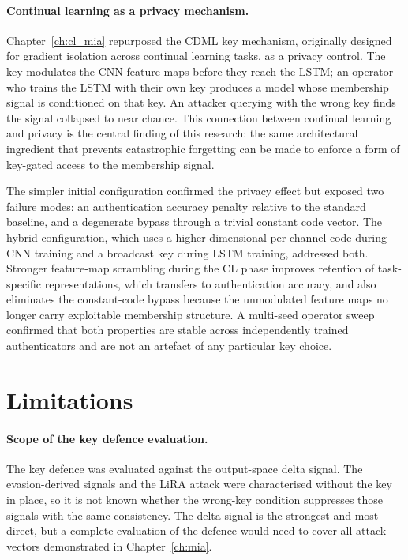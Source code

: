 \paragraph{Continual learning as a privacy mechanism.}
Chapter~\ref{ch:cl_mia} repurposed the CDML key mechanism, originally designed for gradient isolation across continual learning tasks, as a privacy control. The key modulates the CNN feature maps before they reach the LSTM; an operator who trains the LSTM with their own key produces a model whose membership signal is conditioned on that key. An attacker querying with the wrong key finds the signal collapsed to near chance. This connection between continual learning and privacy is the central finding of this research: the same architectural ingredient that prevents catastrophic forgetting can be made to enforce a form of key-gated access to the membership signal.

The simpler initial configuration confirmed the privacy effect but exposed two failure modes: an authentication accuracy penalty relative to the standard baseline, and a degenerate bypass through a trivial constant code vector. The hybrid configuration, which uses a higher-dimensional per-channel code during CNN training and a broadcast key during LSTM training, addressed both. Stronger feature-map scrambling during the CL phase improves retention of task-specific representations, which transfers to authentication accuracy, and also eliminates the constant-code bypass because the unmodulated feature maps no longer carry exploitable membership structure. A multi-seed operator sweep confirmed that both properties are stable across independently trained authenticators and are not an artefact of any particular key choice.

\section{Limitations}
\label{sec:con_limitations}

\paragraph{Scope of the key defence evaluation.}
The key defence was evaluated against the output-space delta signal. The evasion-derived signals and the LiRA attack were characterised without the key in place, so it is not known whether the wrong-key condition suppresses those signals with the same consistency. The delta signal is the strongest and most direct, but a complete evaluation of the defence would need to cover all attack vectors demonstrated in Chapter~\ref{ch:mia}.

